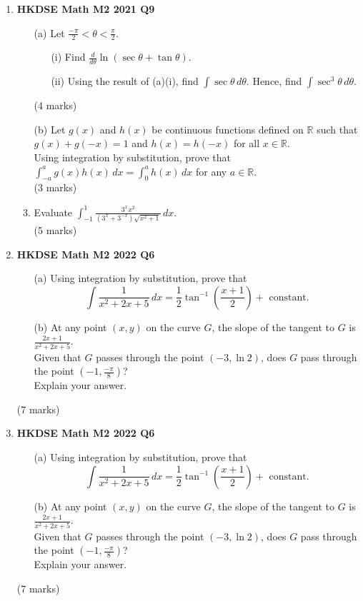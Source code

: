 \documentclass{report}
\begin{document}
\begin{enumerate}
	\item \textbf{HKDSE Math M2 2021 Q9}
	\begin{enumerate}
		\item [(a)] Let $\displaystyle \frac{-\pi}{2} < \theta < \frac{\pi}{2}$.
		\begin{enumerate}
			\item [(i)] Find $\displaystyle \frac{d}{d\theta} \ln{(\sec{\theta} + \tan{\theta})}$.
			\item [(ii)] Using the result of (a)(i), find $\displaystyle \int \sec{\theta} \,d\theta$. Hence, find $\displaystyle \int \sec^3{\theta}\,d\theta$. 
		\end{enumerate}
		(4 marks)
		\item [(b)] Let $g(x)$ and $h(x)$ be continuous functions defined on $\mathbb{R}$ such that $g(x)+g(-x) =1$ and $h(x)=h(-x) $ for all $x \in \mathbb{R}$. \\Using integration by substitution, prove that $\displaystyle\int_{-a}^{a}g(x)h(x)\,dx = \int_{0}^{a}h(x)\,dx$ for any $a \in \mathbb{R}$.\\(3 marks)
		\item Evaluate $\displaystyle \int_{-1}^{1} \frac{3^x x^2}{(3^x+3^{-x})\sqrt{x^2+1}}\,dx$.\\(5 marks)
	\end{enumerate}

	\item \textbf{HKDSE Math M2 2022 Q6}
	\begin{enumerate}
		\item [(a)]Using integration by substitution, prove that $$\displaystyle \int \frac{1}{x^2+2x+5}\,dx = \frac{1}{2} \tan^{-1} \left(\frac{x+1}{2}\right) +\text{ constant.}$$
		\item [(b)]At any point $(x,y)$ on the curve $G$, the slope of the tangent to $G$ is $\displaystyle \frac{2x+1}{x^2+2x+5}$.\\
		Given that $G$ passes through the point $(-3, \ln{2})$, does $G$ pass through the point $\displaystyle \left(-1, \frac{-\pi}{8}\right)$? \\
		Explain your answer.
	\end{enumerate}
	(7 marks)

	\item \textbf{HKDSE Math M2 2022 Q6}
	\begin{enumerate}
		\item [(a)]Using integration by substitution, prove that $$\displaystyle \int \frac{1}{x^2+2x+5}\,dx = \frac{1}{2} \tan^{-1} \left(\frac{x+1}{2}\right) +\text{ constant.}$$
		\item [(b)]At any point $(x,y)$ on the curve $G$, the slope of the tangent to $G$ is $\displaystyle \frac{2x+1}{x^2+2x+5}$.\\
		Given that $G$ passes through the point $(-3, \ln{2})$, does $G$ pass through the point $\displaystyle \left(-1, \frac{-\pi}{8}\right)$? \\
		Explain your answer.
	\end{enumerate}
	(7 marks)


\end{enumerate}
\end{document}
